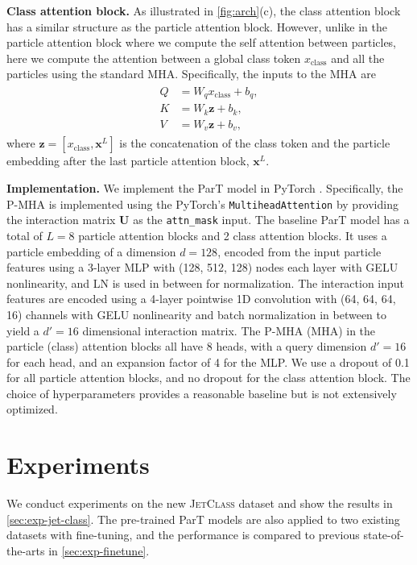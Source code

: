 \documentclass[nohyperref]{article}
\theoremstyle{plain}
\theoremstyle{definition}
\theoremstyle{remark}
\newcommand{\jetclass}{{\textsc{JetClass}}\xspace}
\begin{document}
\textbf{Class attention block.} As illustrated in \cref{fig:arch}(c), the class attention block has a similar structure as the particle attention block. However, unlike in the particle attention block where we compute the self attention between particles, here we compute the attention between a global class token $x_{\text{class}}$ and all the particles using the standard MHA. Specifically, the inputs to the MHA are 
\begin{align}
\begin{split}
    Q &= W_{q} x_{\text{class}} + b_{q}, \\
    K &= W_{k} \textbf{z} + b_{k}, \\
    V &= W_{v} \textbf{z} + b_{v},
\end{split}    
\end{align}
where $\textbf{z}=[x_{\text{class}}, \mathbf{x}^L]$ is the concatenation of the class token and the particle embedding after the last particle attention block, $\mathbf{x}^L$. 

\textbf{Implementation.} We implement the ParT model in PyTorch \cite{NEURIPS2019_9015}. Specifically, the P-MHA is implemented using the PyTorch's \texttt{MultiheadAttention} by providing the interaction matrix $\mathbf{U}$ as the \texttt{attn\_mask} input. The baseline ParT model has a total of $L=8$ particle attention blocks and 2 class attention blocks. It uses a particle embedding of a dimension $d=128$, encoded from the input particle features using a 3-layer MLP with (128, 512, 128) nodes each layer with GELU nonlinearity, and LN is used in between for normalization. The interaction input features are encoded using a 4-layer pointwise 1D convolution with (64, 64, 64, 16) channels with GELU nonlinearity and batch normalization in between to yield a $d'=16$ dimensional interaction matrix. The P-MHA (MHA) in the particle (class) attention blocks all have 8 heads, with a query dimension $d'=16$ for each head, and an expansion factor of 4 for the MLP. We use a dropout of 0.1 for all particle attention blocks, and no dropout for the class attention block.
The choice of hyperparameters provides a reasonable baseline but is not extensively optimized.

\section{Experiments}
\label{sec:experiments}

We conduct experiments on the new \jetclass dataset and show the results in \cref{sec:exp-jet-class}. The pre-trained ParT models are also applied to two existing datasets with fine-tuning, and the performance is compared to previous state-of-the-arts in \cref{sec:exp-finetune}.
\end{document}
